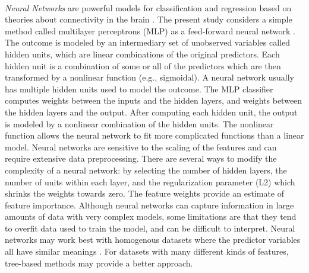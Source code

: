 \\\documentclass[sigconf]{acmart}
\begin{document}
\emph{Neural Networks} are powerful models for classification and 
regression based on theories about connectivity in the brain \cite{kuhn13}. 
The present study considers a simple method called multilayer perceptrons 
(MLP) as a feed-forward neural network \cite{muller17, raschka17}. 
The outcome is modeled by an intermediary set of unobserved variables called 
hidden units, which are linear combinations of the original predictors. 
Each hidden unit is a combination of some or all of the predictors which 
are then transformed by a nonlinear function (e.g., sigmoidal). A neural 
network usually has multiple hidden units used to model the outcome. 
The MLP classifier computes weights between the inputs and the hidden layers, 
and weights between the hidden layers and the output. After computing each 
hidden unit, the output is modeled by a nonlinear combination of the hidden 
units. The nonlinear function allows the neural network to fit more 
complicated functions than a linear model. Neural networks are sensitive to 
the scaling of the features and can require extensive data preprocessing. 
There are several ways to modify the complexity of a neural network: by 
selecting the number of hidden layers, the number of units within each 
layer, and the regularization parameter (L2) which shrinks the weights 
towards zero. The feature weights provide an estimate of feature importance.
Although neural networks can capture information in large amounts of data 
with very complex models, some limitations are that they tend to overfit 
data used to train the model, and can be difficult to interpret. Neural
networks may work best with homogenous datasets where the predictor variables
all have similar meanings \cite{muhuri13}. For datasets with many different
kinds of features, tree-based methods may provide a better approach.

\end{document}
